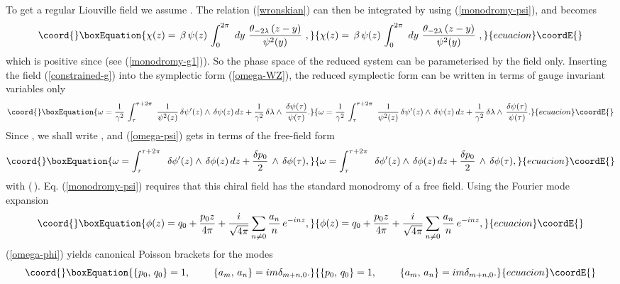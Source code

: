 \documentclass[a4paper,12pt]{article}
\begin{document}
\noindent
To get a regular Liouville field we assume \coordHE{}. The relation
(\ref{wronskian}) can then be integrated by using (\ref{monodromy-psi}),
and \coordHE{} becomes
\begin{equation}\coord{}\boxEquation{\label{chi-psi}
\chi(z)=\,\beta\,\psi (z)\,\int_0^{2\pi}\,\,
dy\,\,\frac{\theta_{-2\lambda}\, (z-y)}{\psi^2(y)}\,\, ,
}{\chi(z)=\,\beta\,\psi (z)\,\int_0^{2\pi}\,\,
dy\,\,\frac{\theta_{-2\lambda}\, (z-y)}{\psi^2(y)}\,\, ,
}{ecuacion}\coordE{}\end{equation}
which is positive since \coordHE{} (see
(\ref{monodromy-g1})). So the phase space of the reduced system can be
parameterised by the field \coordHE{} only.  Inserting the
field (\ref{constrained-g}) into the symplectic form (\ref{omega-WZ}),
the reduced
symplectic form can be written in terms of gauge invariant variables only
\begin{equation}\coord{}\boxEquation{\label{omega-psi}
\omega = \frac{1}{\gamma^2}\,
\int_\tau^{\tau +2\pi}\,\, \frac{1}{\psi^2(z)}
\,\delta\psi'(z)\wedge\,\delta\psi(z)\,dz +
\frac{1}{\gamma^2}\,
\delta\lambda \wedge\, \frac{\delta\psi(\tau)}{\psi(\tau)}.
}{\omega = \frac{1}{\gamma^2}\,
\int_\tau^{\tau +2\pi}\,\, \frac{1}{\psi^2(z)}
\,\delta\psi'(z)\wedge\,\delta\psi(z)\,dz +
\frac{1}{\gamma^2}\,
\delta\lambda \wedge\, \frac{\delta\psi(\tau)}{\psi(\tau)}.
}{ecuacion}\coordE{}\end{equation}
Since \coordHE{}, we shall write \coordHE{},
and (\ref{omega-psi}) gets in terms of \coordHE{} the free-field form
\begin{equation}\coord{}\boxEquation{\label{omega-phi}
\omega =
\int_\tau^{\tau +2\pi}\,\,
\,\delta\phi'(z)\wedge\,\delta\phi(z)\,dz +
\frac{\delta {p_0}}{2}\,
\wedge\, \delta\phi(\tau),
}{\omega =
\int_\tau^{\tau +2\pi}\,\,
\,\delta\phi'(z)\wedge\,\delta\phi(z)\,dz +
\frac{\delta {p_0}}{2}\,
\wedge\, \delta\phi(\tau),
}{ecuacion}\coordE{}\end{equation}
with \coordHE{} (\,\coordHE{}). Eq. (\ref{monodromy-psi})
requires that this chiral field \coordHE{} has
the standard monodromy \coordHE{} of a free field.
Using the Fourier mode expansion
\begin{equation}\coord{}\boxEquation{\label{phi-mode}
\phi (z)= q_0+
\frac{p_0z}{4\pi}+\frac{i}{\sqrt {4\pi}}\sum_{n\neq 0}\frac{a_n}{n}\, e^{-inz},
}{\phi (z)= q_0+
\frac{p_0z}{4\pi}+\frac{i}{\sqrt {4\pi}}\sum_{n\neq 0}\frac{a_n}{n}\, e^{-inz},
}{ecuacion}\coordE{}\end{equation}
(\ref{omega-phi}) yields canonical Poisson brackets
for the modes
\begin{equation}\coord{}\boxEquation{\label{canonicalPB}
\{ p_0,\, q_0\} =1,~~~~~~~\{a_m,\, a_n\}=im\delta_{m+n,0}.
}{\{ p_0,\, q_0\} =1,~~~~~~~\{a_m,\, a_n\}=im\delta_{m+n,0}.
}{ecuacion}\coordE{}\end{equation}
\end{document}
